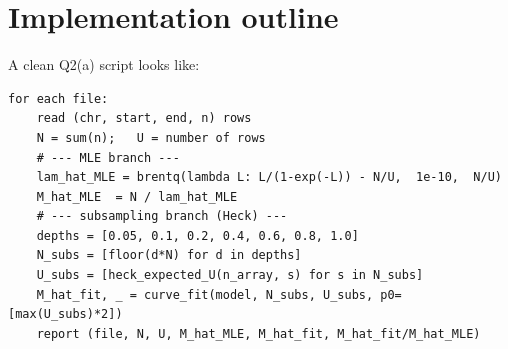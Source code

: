 \documentclass[11pt]{article}
\begin{document}
\section{Implementation outline}

A clean Q2(a) script looks like:

\begin{tcolorbox}[colback=gray!8,colframe=gray!50,title=\textbf{Pseudocode}]
\small
\begin{verbatim}
for each file:
    read (chr, start, end, n) rows
    N = sum(n);   U = number of rows
    # --- MLE branch ---
    lam_hat_MLE = brentq(lambda L: L/(1-exp(-L)) - N/U,  1e-10,  N/U)
    M_hat_MLE  = N / lam_hat_MLE
    # --- subsampling branch (Heck) ---
    depths = [0.05, 0.1, 0.2, 0.4, 0.6, 0.8, 1.0]
    N_subs = [floor(d*N) for d in depths]
    U_subs = [heck_expected_U(n_array, s) for s in N_subs]
    M_hat_fit, _ = curve_fit(model, N_subs, U_subs, p0=[max(U_subs)*2])
    report (file, N, U, M_hat_MLE, M_hat_fit, M_hat_fit/M_hat_MLE)
\end{verbatim}
\end{tcolorbox}
\end{document}
